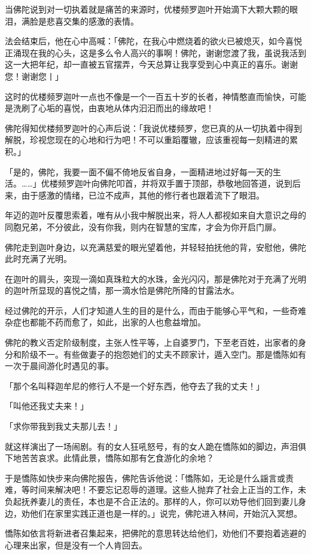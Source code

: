 \documentclass[twoside,openany]{book}
\begin{document}
当佛陀说到对一切执着就是痛苦的来源时，优楼频罗迦叶开始滴下大颗大颗的眼泪，满脸是悲喜交集的感激的表情。

法会结束后，他在心中高喊：「佛陀，在我心中燃烧着的欲火已被熄灭，如今喜悦正涌现在我的心头，这是多么令人高兴的事啊！佛陀，谢谢您渡了我，虽说我活到这一大把年纪，却一直被五官摆弄，今天总算让我享受到心中真正的喜乐。谢谢您！谢谢您丨」

这时的优楼频罗迦叶一点也不像是一个一百五十岁的长者，神情憨直而愉快，可能是洗刷了心垢的喜悦，由衷地从体内汩汩而出的缘故吧！

佛陀得知优楼频罗迦叶的心声后说：「我说优楼频罗，您已真的从一切执着中得到解脱，珍视您现在的心地和行为吧！不可以重蹈覆辙，应该重视每一刻精进的累积。」

「是的，佛陀，我要一面不偏不倚地反省自身，一面精进地过好每一天的生活。……」优楼频罗迦叶向佛陀叩首，并将双手置于顶部，恭敬地回答道，说到后来，由于感激的情绪，已泣不成声，其他的修行者也跟着流下了眼泪。

年迈的迦叶反覆思索着，唯有从小我中解脱出来，将人人都视如来自大意识之母的同胞兄弟，不分彼此，没有你我，则内在智慧的宝库，才会为你开启门扉。

佛陀走到迦叶身边，以充满慈爱的眼光望着他，并轻轻拍抚他的背，安慰他，佛陀此时充满了光明。

在迦叶的肩头，突现一滴如真珠粒大的水珠，金光闪闪，那是佛陀对于充满了光明的迦叶所显现的喜悦之情，那一滴水恰是佛陀所降的甘露法水。

经过佛陀的开示，人们才知道人生的目的是什么，而由于能够心平气和，一些奇难杂症也都能不药而愈了，如此，出家的人也愈益增加。

佛陀的教义否定阶级制度，主张人性平等，上自婆罗门，下至老百姓，出家者的身分和阶级不一。有些做妻子的抱怨她们的丈夫不顾家计，遁入空门。那是憍陈如有一次于晨间游化时遇见的事。

「那个名叫释迦牟尼的修行人不是一个好东西，他夺去了我的丈夫！」

「叫他还我丈夫来！」

「求你带我到我丈夫那儿去！」

就这样演出了一场闹剧。有的女人狂吼怒号，有的女人跪在憍陈如的脚边，声泪俱下地苦苦哀求。此情此景，憍陈如那有乞食游化的余地？

于是憍陈如快步来向佛陀报告，佛陀告诉他说：「憍陈如，无论是什么謡言或责难，等时间来解决吧！不要忘记忍辱的道理。这些人抛弃了社会上正当的工作，未负起抚养妻儿的责任，本也是不合正法的。那样的人，你可以劝导他们回到妻儿身边，劝他们在家里实践正道也是一样的。」说完，佛陀进入林间，开始沉入冥想。

憍陈如依言将新进者召集起来，把佛陀的意思转达给他们，劝他们不要抱着逃避的心理来出家，但是没有一个人肯回去。
\end{document}
